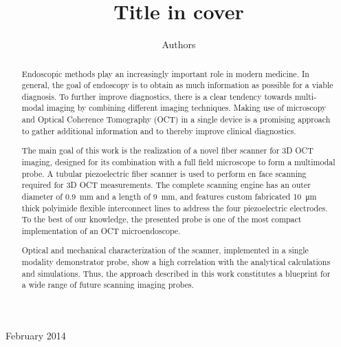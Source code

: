 \documentclass[10pt]{iopart}
\begin{document}
\title[Title on header]{Title in cover}

\author{Authors}

\address{Address}
\vspace{10pt}
\begin{indented}
\item[]February 2014
\end{indented}

\begin{abstract}
Endoscopic methods play an increasingly important role in modern medicine. In general, the goal of endoscopy is to obtain as much information as possible for a viable diagnosis. To further improve diagnostics, there is a clear tendency towards multi-modal imaging by combining different imaging techniques. Making use of microscopy and Optical Coherence Tomography (OCT) in a single device is a promising approach to gather additional information and to thereby improve clinical diagnostics. 

The main goal of this work is the realization of a novel fiber scanner for 3D OCT imaging, designed for its combination with a full field microscope to form a multimodal probe. A tubular piezoelectric fiber scanner is used to perform en face scanning required for 3D OCT measurements. The complete scanning engine has an outer diameter of \SI{0.9}{\milli\meter} and a length of \SI{9}{\milli\meter}, and features custom fabricated \SI{10}{\micro\meter} thick polyimide flexible interconnect lines to address the four piezoelectric electrodes. To the best of our knowledge, the presented probe is one of the most compact implementation of an OCT microendoscope.

Optical and mechanical characterization of the scanner, implemented in a single modality demonstrator probe, show a high correlation with the analytical calculations and simulations. Thus, the approach described in this work constitutes a blueprint for a wide range of future scanning imaging probes.

\end{abstract}
%
%
%
% 
\ioptwocol
%
\end{document}
